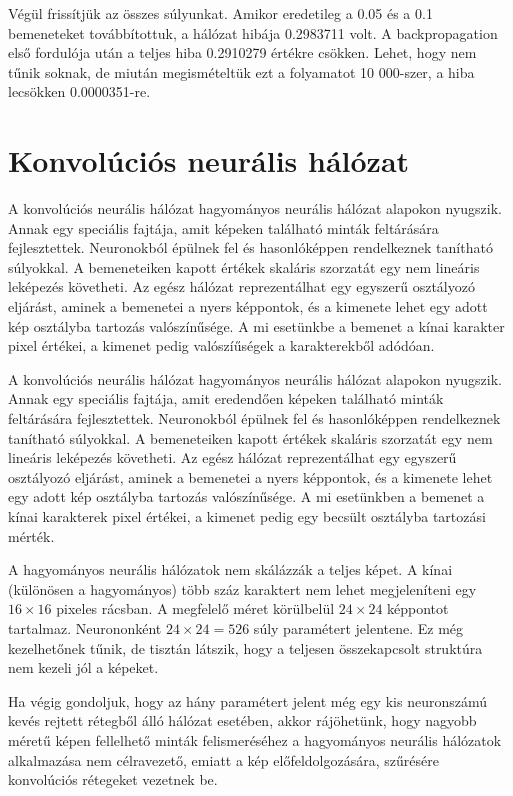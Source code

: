 Végül frissítjük az összes súlyunkat. Amikor eredetileg a 0.05 és a 0.1 bemeneteket továbbítottuk, a hálózat hibája 0.2983711 volt. A backpropagation első fordulója után a teljes hiba 0.2910279 értékre csökken. Lehet, hogy nem tűnik soknak, de miután megismételtük ezt a folyamatot 10 000-szer, a hiba lecsökken 0.0000351-re.

\section{Konvolúciós neurális hálózat}

A konvolúciós neurális hálózat\cite{liconvolution}\cite{lecun1995convolutional} hagyományos neurális hálózat alapokon nyugszik. Annak egy speciális fajtája, amit képeken található minták feltárására fejlesztettek. Neuronokból épülnek fel és hasonlóképpen rendelkeznek tanítható súlyokkal. A bemeneteiken kapott értékek skaláris szorzatát egy nem lineáris leképezés követheti. Az egész hálózat reprezentálhat egy egyszerű osztályozó eljárást, aminek a bemenetei a nyers képpontok, és a kimenete lehet egy adott kép osztályba tartozás valószínűsége. A mi esetünkbe a bemenet a kínai karakter pixel értékei, a kimenet pedig valószíűségek a karakterekből adódóan.

A konvolúciós neurális hálózat hagyományos neurális hálózat alapokon nyugszik. Annak egy speciális fajtája, amit eredendően képeken található minták feltárására fejlesztettek. Neuronokból épülnek fel és hasonlóképpen rendelkeznek tanítható súlyokkal. A bemeneteiken kapott értékek skaláris szorzatát egy nem lineáris leképezés követheti. Az egész hálózat reprezentálhat egy egyszerű osztályozó eljárást, aminek a bemenetei a nyers képpontok, és a kimenete lehet egy adott kép osztályba tartozás valószínűsége. A mi esetünkben a bemenet a kínai karakterek pixel értékei, a kimenet pedig egy becsült osztályba tartozási mérték.

A hagyományos neurális hálózatok nem skálázzák a teljes képet. A kínai (különösen a hagyományos) több száz karaktert nem lehet megjeleníteni egy $16 \times 16$ pixeles rácsban. A megfelelő méret körülbelül $24 \times 24$ képpontot tartalmaz. Neurononként $24 \times 24 = 526$ súly paramétert jelentene. Ez még kezelhetőnek tűnik, de tisztán látszik, hogy a teljesen összekapcsolt struktúra nem kezeli jól a képeket.

Ha végig gondoljuk, hogy az hány paramétert jelent még egy kis neuronszámú kevés rejtett rétegből álló hálózat esetében, akkor rájöhetünk, hogy nagyobb méretű képen fellelhető minták felismeréséhez a hagyományos neurális hálózatok alkalmazása nem célravezető, emiatt a kép előfeldolgozására, szűrésére konvolúciós rétegeket vezetnek be.

